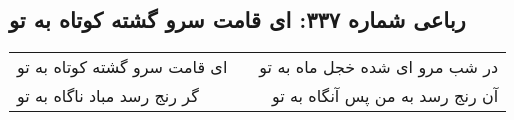 \begin{center}
\section*{رباعی شماره ۳۳۷: ای قامت سرو گشته کوتاه به تو}
\label{sec:sh337}
\begin{longtable}{l p{0.5cm} r}
ای قامت سرو گشته کوتاه به تو
&&
در شب مرو ای شده خجل ماه به تو
\\
گر رنج رسد مباد ناگاه به تو
&&
آن رنج رسد به من پس آنگاه به تو
\\
\end{longtable}
\end{center}
